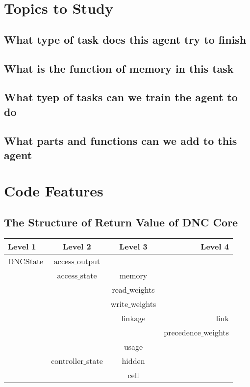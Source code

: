 \documentclass{article}
\begin{document}
\section{Topics to Study}
\subsection{What type of task does this agent try to finish}
\subsection{What is the function of memory in this task}
\subsection{What tyep of tasks can we train the agent to do}
\subsection{What parts and functions can we add to this agent}

\section{Code Features}
\subsection{The Structure of Return Value of DNC Core}
\begin{table}
\centering
\begin{tabular}{| l | c | c | r |} \hline
Level 1  & Level 2          & Level 3           & Level 4  \\ \hline
DNCState & access$\_$output &                   &   \\ \hline
         & access$\_$state  & memory            &   \\ \hline
         &                  & read$\_$weights   &   \\ \hline
         &                  & write$\_$weights  &   \\ \hline
         &                  & linkage           & link \\ \hline
         &                  &                   & precedence$\_$weights \\ \hline
         &                  & usage             & \\ \hline
         & controller$\_$state    & hidden            & \\ \hline
         &                  & cell              & \\ \hline


\end{tabular}
\end{table}
\end{document}
